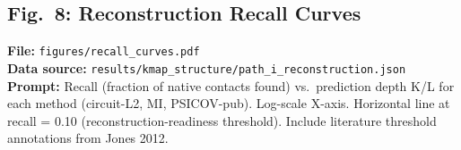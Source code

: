 \subsection*{Fig.~8: Reconstruction Recall Curves}
\textbf{File:} \texttt{figures/recall\_curves.pdf}\\
\textbf{Data source:} \texttt{results/kmap\_structure/path\_i\_reconstruction.json}\\
\textbf{Prompt:} Recall (fraction of native contacts found) vs.\ prediction
depth K/L for each method (circuit-L2, MI, PSICOV-pub).  Log-scale X-axis.
Horizontal line at recall = 0.10 (reconstruction-readiness threshold).
Include literature threshold annotations from Jones 2012.
